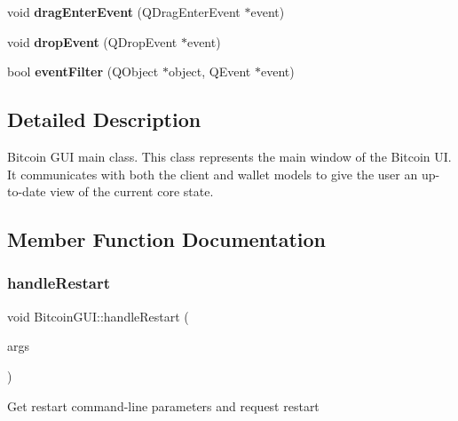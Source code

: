 \begin{DoxyCompactItemize}
\item 
\mbox{\label{class_bitcoin_g_u_i_a8c241174b5b109c2b27019bad289e34d}} 
void {\bfseries drag\+Enter\+Event} (Q\+Drag\+Enter\+Event $\ast$event)
\item 
\mbox{\label{class_bitcoin_g_u_i_a1faa00034444ca5930f0751b86646b68}} 
void {\bfseries drop\+Event} (Q\+Drop\+Event $\ast$event)
\item 
\mbox{\label{class_bitcoin_g_u_i_aeee2453bf1a3fb39bb22757e21f676d4}} 
bool {\bfseries event\+Filter} (Q\+Object $\ast$object, Q\+Event $\ast$event)
\end{DoxyCompactItemize}


\subsection{Detailed Description}
Bitcoin G\+UI main class. This class represents the main window of the Bitcoin UI. It communicates with both the client and wallet models to give the user an up-\/to-\/date view of the current core state. 

\subsection{Member Function Documentation}
\mbox{\label{class_bitcoin_g_u_i_a0f9d1262e45413fa51a395d41f615917}} 
\subsubsection{\texorpdfstring{handleRestart}{handleRestart}\hspace{0.1cm}{\footnotesize\ttfamily [1/2]}}
{\footnotesize\ttfamily void Bitcoin\+G\+U\+I\+::handle\+Restart (\begin{DoxyParamCaption}\item[{Q\+String\+List}]{args }\end{DoxyParamCaption})\hspace{0.3cm}{\ttfamily [slot]}}

Get restart command-\/line parameters and request restart \mbox{\label{class_bitcoin_g_u_i_a0f9d1262e45413fa51a395d41f615917}} 
